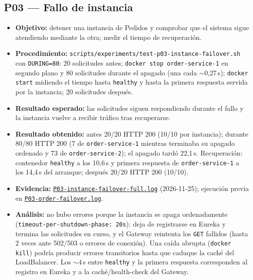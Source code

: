 \documentclass[
  spanish,
  a4paper,
  11pt
]{article}
\providecommand{\tightlist}{\setlength{\itemsep}{0pt}\setlength{\parskip}{0pt}}
\newcommand{\evid}[1]{\href{https://github.com/yan2005dris-afk/SDCC---microservices-with-gateway-and-loadbalancer/blob/develop/docs/evidencias/#1}{{\urlstyle{tt}\nolinkurl{#1}}}}
\begin{document}
\subsection{P03 --- Fallo de instancia}
\begin{itemize}
\tightlist
\item \textbf{Objetivo:} detener una instancia de Pedidos y comprobar que el sistema sigue atendiendo mediante la otra; medir el tiempo de recuperación.
\item \textbf{Procedimiento:} \texttt{scripts/experiments/test-p03-instance-failover.sh} con \texttt{DURING=80}: 20 solicitudes antes; \texttt{docker stop order-service-1} en segundo plano y 80 solicitudes durante el apagado (una cada $\sim$0,27\,s); \texttt{docker start} midiendo el tiempo hasta \texttt{healthy} y hasta la primera respuesta servida por la instancia; 20 solicitudes después.
\item \textbf{Resultado esperado:} las solicitudes siguen respondiendo durante el fallo y la instancia vuelve a recibir tráfico tras recuperarse.
\item \textbf{Resultado obtenido:} antes 20/20 HTTP 200 (10/10 por instancia); durante 80/80 HTTP 200 (7 de \texttt{order-service-1} mientras terminaba su apagado ordenado y 73 de \texttt{order-service-2}); el apagado tardó 22,1\,s. Recuperación: contenedor \texttt{healthy} a los 10,6\,s y primera respuesta de \texttt{order-service-1} a los 14,4\,s del arranque; después 20/20 HTTP 200 (10/10).
\item \textbf{Evidencia:} \evid{P03-instance-failover-full.log} (2026-11-25); ejecución previa en \evid{P03-order-failover.log}.
\item \textbf{Análisis:} no hubo errores porque la instancia se apaga ordenadamente (\texttt{timeout-per-shutdown-phase: 20s}): deja de registrarse en Eureka y termina las solicitudes en curso, y el Gateway reintenta los \texttt{GET} fallidos (hasta 2 veces ante 502/503 o errores de conexión). Una caída abrupta (\texttt{docker kill}) podría producir errores transitorios hasta que caduque la caché del LoadBalancer. Los $\sim$4\,s entre \texttt{healthy} y la primera respuesta corresponden al registro en Eureka y a la caché/health-check del Gateway.
\end{itemize}
\end{document}
